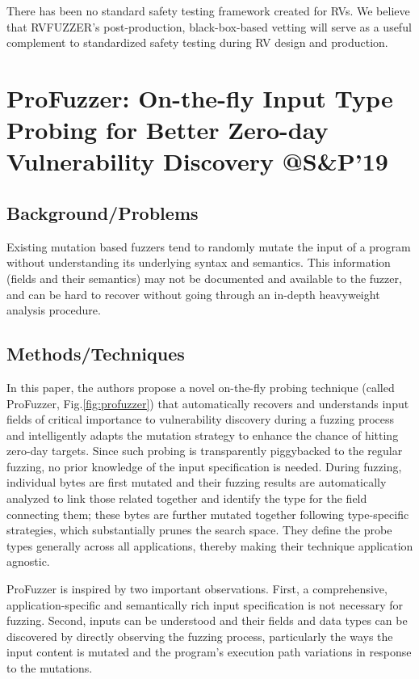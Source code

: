 There has been no standard safety testing framework created for RVs. We believe that RVFUZZER’s post-production, black-box-based vetting will serve as a useful complement to standardized safety testing during RV design and production.

\newpage
\section{ProFuzzer: On-the-fly Input Type Probing for Better
Zero-day Vulnerability Discovery @S\&P'19}
\subsection{Background/Problems}
Existing mutation based fuzzers tend to randomly mutate the input of a program without understanding its underlying syntax and semantics.  This information (fields and their semantics) may not be documented and available to the fuzzer, and can be hard to recover without going through an in-depth heavyweight analysis procedure. 
\subsection{Methods/Techniques}
 In this paper, the authors propose a novel on-the-fly probing technique (called ProFuzzer, Fig.\ref{fig:profuzzer}) that automatically recovers and understands input fields of critical importance to vulnerability discovery during a fuzzing process and intelligently adapts the mutation strategy to enhance the chance of hitting zero-day targets. Since such probing is transparently piggybacked to the regular fuzzing, no prior knowledge of the input specification is needed. During fuzzing, individual bytes are first mutated and their fuzzing results are automatically analyzed to link those related together and identify the type for the field connecting them; these bytes are further mutated together following type-specific strategies, which substantially prunes the search space.  They define the probe types generally across all applications, thereby making their technique application agnostic.

ProFuzzer is inspired by two important observations. First, a comprehensive, application-specific and semantically rich input specification is not necessary for fuzzing.  Second, inputs can be understood and their fields and data types can be discovered by directly observing the fuzzing process, particularly the ways the input content is mutated and the program’s execution path variations in response to the mutations. 

